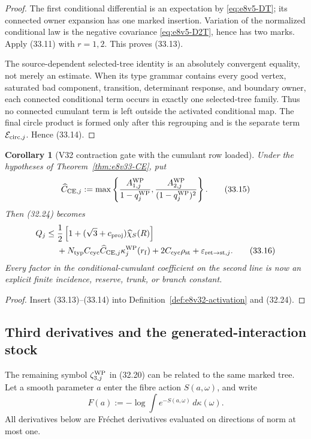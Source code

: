 \documentclass[11pt,oneside]{book}
\newtheorem{corollary}[theorem]{Corollary}
\theoremstyle{definition}
\theoremstyle{remark}
\begin{document}
\begin{proof}
The first conditional differential is an expectation by
\eqref{eq:e8v5-DT}; its connected owner expansion has one marked
insertion.  Variation of the normalized conditional law is the
negative covariance \eqref{eq:e8v5-D2T}, hence has two marks.
Apply (33.11) with \(r=1,2\).  This proves (33.13).

The source-dependent selected-tree identity is an absolutely
convergent equality, not merely an estimate.  When its type grammar
contains every good vertex, saturated bad component, transition,
determinant response, and boundary owner, each connected conditional
term occurs in exactly one selected-tree family.  Thus no connected
cumulant term is left outside the activated conditional map.
The final circle product is formed only after this regrouping and is
the separate term \({\cal E}_{{\rm circ},j}\).  Hence (33.14).
\end{proof}

\begin{corollary}[V32 contraction gate with the cumulant row loaded]
\label{cor:e8v33-loaded-gate}
Under the hypotheses of
Theorem~\ref{thm:e8v33-CE}, put
\[
 \widehat C_{{\rm CE},j}:=
 \max\left\{
 \frac{A_{1,j}^{\rm WP}}{1-q_j^{\rm WP}},
 \frac{A_{2,j}^{\rm WP}}{(1-q_j^{\rm WP})^2}
 \right\}.                                                       \tag{33.15}
\]
Then (32.24) becomes
\[
\begin{split}
 Q_j\leq{}&
 \frac12\left[
 1+(\sqrt3+c_{\rm proj})\widehat\chi_S(R)
 \right]\\
 &+
 N_{\rm typ}C_{\rm cyc}\widehat C_{{\rm CE},j}
 \kappa_j^{\rm WP}(r_{\rm f})
 +2C_{\rm cyc}\rho_{\rm st}
 +\varepsilon_{{\rm ret}\to{\rm st},j}.                         \tag{33.16}
\end{split}
\]
Every factor in the conditional-cumulant coefficient on the second
line is now an explicit finite incidence, reserve, trunk, or branch
constant.
\end{corollary}

\begin{proof}
Insert (33.13)--(33.14) into
Definition~\ref{def:e8v32-activation} and (32.24).
\end{proof}

\subsection{Third derivatives and the generated-interaction stock}

The remaining symbol \(\zeta^{\rm WP}_{3,j}\) in (32.20) can be
related to the same marked tree.  Let a smooth parameter \(a\) enter
the fibre action \(S(a,\omega)\), and write
\[
 F(a):=-\log\int e^{-S(a,\omega)}\,d\kappa(\omega).               \tag{33.17}
\]
All derivatives below are Fr\'echet derivatives evaluated on
directions of norm at most one.
\end{document}
